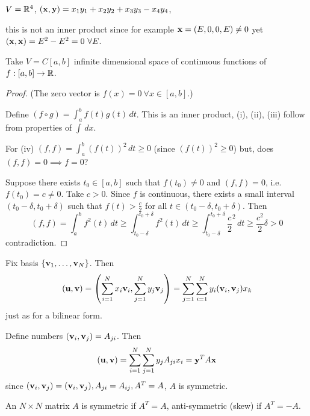 \documentclass[10pt, a4paper]{article}
\begin{document}
\begin{example}
    $V = \mathbb{R} ^ 4$,
    $(\mathbf{x}, \mathbf{y}) = x_1y_1 + x_2y_2 + x_3y_3 - x_4y_4$,

    this is not an inner product since for example
    $\mathbf{x} = (E, 0, 0, E) \neq 0$ yet $(\mathbf{x}, \mathbf{x}) = E ^ 2 - E ^ 2 = 0\ \forall E$.
\end{example}

\begin{example}
    Take $V = C[a, b]$ infinite dimensional space of continuous functions of $f : [a, b] \rightarrow \mathbb{R}$.

    \begin{proof}
        (The zero vector is $f(x) = 0\ \forall x \in [a, b]$.)
    
        Define $(f \circ g) = \int_{a}^{b}f(t)g(t)\,dt$.
        This is an inner product,
        (i), (ii), (iii) follow from properties of $\int\,dx$.
    
        For (iv)
        $(f, f) = \int_{a}^{b}(f(t)) ^ 2\,dt \geq 0$
        (since $(f(t)) ^ 2 \geq 0$)
        but,
        does $(f, f) = 0 \implies f = 0$?

        Suppose there exists $t_0 \in [a, b]$ such that $f(t_0) \neq 0$ and $(f, f) = 0$,
        i.e. $f(t_0) = c \neq 0$.
        Take $c > 0$.
        Since $f$ is continuous,
        there exists a small interval $(t_0 - \delta, t_0 + \delta)$ such that $f(t) > \frac{c}{2}$ for all $t \in (t_0 - \delta, t_0 + \delta)$.
        Then
        \[
        (f, f) = \int_{a}^{b}f ^ 2(t)\,dt \geq \int_{t_0 - \delta}^{t_0 + \delta}f ^ 2(t)\,dt \geq \int_{t_0 - \delta}^{t_0 + \delta}\frac{c}{2} ^ 2\,dt \geq \frac{c ^ 2}{2}\delta > 0
        \]
        contradiction.
    \end{proof}
\end{example}

Fix basis $\{\mathbf{v}_1, \dotsc, \mathbf{v}_N\}$.
Then
\[
(\mathbf{u}, \mathbf{v}) = \left(\sum_{i = 1}^{N}x_i\mathbf{v}_i, \sum_{j = 1}^{N}y_j\mathbf{v}_j\right) = \sum_{j = 1}^{N}\sum_{i = 1}^{N}y_i(\mathbf{v}_i, \mathbf{v}_j)x_k
\]
just as for a bilinear form.

Define numbers
$(\mathbf{v}_i, \mathbf{v}_j) = A_{ji}$.
Then
\[
(\mathbf{u}, \mathbf{v}) = \sum_{i = 1}^{N}\sum_{j = 1}^{N}y_jA_{ji}x_i = \mathbf{y} ^ TA\mathbf{x}
\]
since $(\mathbf{v}_i, \mathbf{v}_j) = (\mathbf{v}_i, \mathbf{v}_j), A_{ji} = A_{ij}, A ^ T = A$,
$A$ is symmetric.

\begin{definition}
    An $N \times N$ matrix $A$ is symmetric if $A ^ T = A$,
    anti-symmetric
    (skew)
    if $A ^ T = -A$.
\end{definition}
\end{document}
